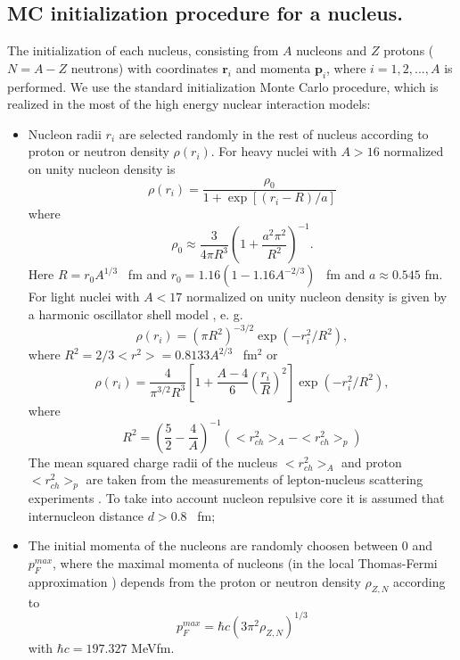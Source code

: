 \subsection{ MC initialization procedure for a nucleus.}
\hspace{1.0em}The initialization of each nucleus, consisting from $A$
nucleons and $Z$ protons ($N=A-Z$ neutrons) 
with coordinates $\mathbf{r}_i$ and momenta
$\mathbf{p}_i$, where $i = 1,2,...,A$ is performed.
We use the standard initialization Monte Carlo procedure, which
is realized in the most of the high energy nuclear interaction models:
\begin{itemize}
\item Nucleon radii $r_i$ are selected randomly in the rest of nucleus according 
to proton or neutron density $\rho(r_i)$. 
For heavy nuclei with $A > 16$ \cite{GLMP91} normalized on unity 
nucleon density is
\begin{equation}
\label{NIS1}\rho(r_i) = 
 \frac{\rho_0}{1 + \exp{[(r_i - R)/a]}}
\end{equation}
where
\begin{equation}
\label{NIS2}\rho_0 \approx \frac{3}{4\pi R^3}(1+\frac{a^2\pi^2}{R^2})^{-1}.
\end{equation} 
Here $R=r_0 A^{1/3}$ \ fm and $r_0=1.16(1-1.16A^{-2/3})$ \ fm and $a
\approx 0.545$ fm.  For light nuclei with $A < 17$ normalized on unity 
nucleon density is
given by a harmonic oscillator shell model \cite{Elton61}, e. g.
\begin{equation}
\label{NIS2a} \rho(r_i) = (\pi R^2)^{-3/2}\exp{(-r_i^2/R^2)},
\end{equation}
where $R^2 = 2/3<r^2> = 0.8133 A^{2/3}$ \ fm$^2$ or 
\begin{equation}
\label{NIS3} \rho(r_i) =
\frac{4}{\pi^{3/2}R^3}[1+\frac{A-4}{6}(\frac{r_i}{R})^2]
\exp{(-r_i^2/R^2)},
\end{equation}
where
\begin{equation}
\label{NIS4} R^2=(\frac{5}{2}-\frac{4}{A})^{-1}(<r^2_{ch}>_{A}- 
<r^2_{ch}>_{p})
\end{equation}
The mean squared charge radii of the nucleus $<r^2_{ch}>_{A}$ and proton
$<r^2_{ch}>_{p}$ are taken from the measurements of lepton-nucleus
scattering experiments \cite{BJ77}.  To take into account nucleon
repulsive core it is assumed that internucleon distance $d > 0.8$ \ fm;

\item The initial momenta of the nucleons are randomly choosen between $0$ and 
$p^{max}_F$, where 
the maximal momenta of nucleons (in the local Thomas-Fermi 
approximation \cite{DF74}) depends from
the proton or neutron density $\rho_{Z,N}$ according to 
\begin{equation}
\label{NIS5} p^{max}_F = \hbar c(3\pi^2 \rho_{Z,N})^{1/3}
\end{equation}
with $\hbar c = 197.327$ MeVfm. 


\end{itemize}
